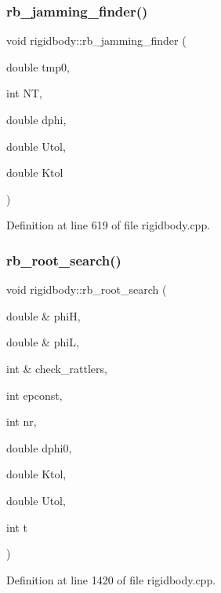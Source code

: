 \subsubsection{\texorpdfstring{rb\+\_\+jamming\+\_\+finder()}{rb\_jamming\_finder()}}
{\footnotesize\ttfamily void rigidbody\+::rb\+\_\+jamming\+\_\+finder (\begin{DoxyParamCaption}\item[{double}]{tmp0,  }\item[{int}]{NT,  }\item[{double}]{dphi,  }\item[{double}]{Utol,  }\item[{double}]{Ktol }\end{DoxyParamCaption})}



Definition at line 619 of file rigidbody.\+cpp.

\mbox{\label{classrigidbody_ace2c7ef24606c9912fd004a293569b6c}} 
\subsubsection{\texorpdfstring{rb\+\_\+root\+\_\+search()}{rb\_root\_search()}}
{\footnotesize\ttfamily void rigidbody\+::rb\+\_\+root\+\_\+search (\begin{DoxyParamCaption}\item[{double \&}]{phiH,  }\item[{double \&}]{phiL,  }\item[{int \&}]{check\+\_\+rattlers,  }\item[{int}]{epconst,  }\item[{int}]{nr,  }\item[{double}]{dphi0,  }\item[{double}]{Ktol,  }\item[{double}]{Utol,  }\item[{int}]{t }\end{DoxyParamCaption})}



Definition at line 1420 of file rigidbody.\+cpp.

\mbox{\label{classrigidbody_aede3f62a6b910a9bc10641de08a1f329}} 
